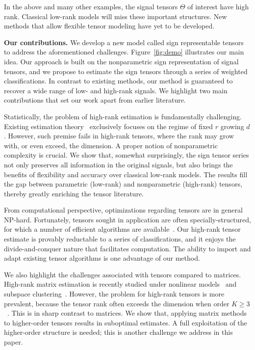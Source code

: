 \documentclass{article}
\theoremstyle{plain}
\theoremstyle{definition}
\begin{document}
In the above and many other examples, the signal tensors $\Theta$ of interest have high rank. Classical low-rank models will miss these important structures. New methods that allow flexible tensor modeling have yet to be developed. 

{\bf Our contributions.}
We develop a new model called sign representable tensors to address the aforementioned challenges. 
Figure~\ref{fig:demo} illustrates our main idea. Our approach is built on the nonparametric sign representation of signal tensors, and we propose to estimate the sign tensors through a series of weighted classifications. In contrast to existing methods, our method is guaranteed to recover a wide range of low- and high-rank signals. We highlight two main contributions that set our work apart from earlier literature. 

Statistically, the problem of high-rank estimation is fundamentally challenging. Existing estimation theory~\cite{montanari2018spectral,cai2019nonconvex,ghadermarzy2019near} exclusively focuses on the regime of fixed $r$ growing $d$. However, such premise fails in high-rank tensors, where the rank may grow with, or even exceed, the dimension. A proper notion of nonparametric complexity is crucial. We show that, somewhat surprisingly, the sign tensor series not only preserves all information in the original signals, but also brings the benefits of flexibility and accuracy over classical low-rank models. The results fill the gap between parametric (low-rank) and nonparametric (high-rank) tensors, thereby greatly enriching the tensor literature. 

From computational perspective, optimizations regarding tensors are in general NP-hard. Fortunately, tensors sought in application are often specially-structured, for which a number of efficient algorithms are available~\cite{ghadermarzy2018learning,wang2018learning, han2020optimal}. Our high-rank tensor estimate is provably reductable to a series of classifications, and it enjoys the divide-and-conquer nature that facilitates computation. The ability to import and adapt existing tensor algorithms is one advantage of our method. 

We also highlight the challenges associated with tensors compared to matrices. High-rank matrix estimation is recently studied under nonlinear models~\cite{ganti2015matrix} and subspace clustering~\cite{pmlr-v70-ongie17a,fan2019online}. However, the problem for high-rank tensors is more prevalent, because the tensor rank often exceeds the dimension when order $K\geq 3$~\cite{anandkumar2017analyzing}. This is in sharp contrast to matrices. We show that, applying matrix methods to higher-order tensors results in suboptimal estimates. A full exploitation of the higher-order structure is needed; this is another challenge we address in this paper.
\end{document}

